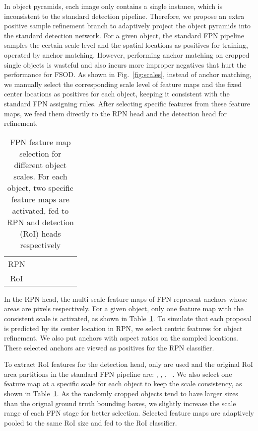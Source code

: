\documentclass[runningheads]{llncs}
\begin{document}
In object pyramids, each image only contains a single instance, which is inconsistent to the standard detection pipeline.
Therefore, we propose an extra positive sample refinement branch to adaptively project the object pyramids into the standard detection network.
For a given object, the standard FPN pipeline samples the certain scale level and the spatial locations as positives for training, operated by anchor matching.
However, performing anchor matching on cropped single objects is wasteful and also incurs more improper negatives that hurt the performance for FSOD.
As shown in Fig.~\ref{fig:scales}, instead of anchor matching, we manually select the corresponding scale level of feature maps and the fixed center locations as positives for each object, keeping it consistent with the standard FPN assigning rules.
After selecting specific features from these feature maps, we feed them directly to the RPN head and the detection head for refinement.
\setlength{\tabcolsep}{4pt}
\begin{table}
	\begin{center}
		\caption{FPN feature map selection for different object scales. For each object, two specific feature maps are activated, fed to RPN and detection (RoI) heads respectively}
		\label{table:scalereftable}
		\begin{tabular}{c|cccccc}
			\hline
			&  &  &  &  &  &  \\
			\hline
			RPN &  &  &   &   &   &   \\
			RoI &  &  &   &   &   &   \\
			\hline
		\end{tabular}
	\end{center}
\end{table}
\setlength{\tabcolsep}{1.4pt}

In the RPN head, the multi-scale feature maps of FPN   represent anchors whose areas are  pixels respectively. 
For a given object, only one feature map with the consistent scale is activated, as shown in Table~\ref{table:scalereftable}.
To simulate that each proposal is predicted by its center location in RPN, we select centric  features for object refinement.
We also put anchors with  aspect ratios on the sampled locations.  
These selected anchors are viewed as positives for the RPN classifier. 

To extract RoI features for the detection head, only  are used and the original RoI area partitions in the standard FPN pipeline are: , , , ~\cite{fpn}. 
We also select one feature map at a specific scale for each object to keep the scale consistency, as shown in Table~\ref{table:scalereftable}. 
As the randomly cropped objects tend to have larger sizes than the orignal ground truth bounding boxes, we slightly increase the scale range of each FPN stage for better selection.
Selected feature maps are adaptively pooled to the same RoI size and fed to the RoI classifier. 
\end{document}
